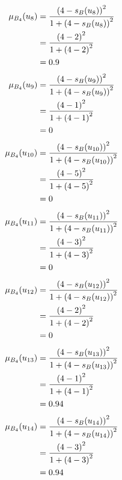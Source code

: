 \documentclass[a4paper]{book}
\begin{document}
				\begin{align}
					\mu_{B_4}(u_8) &= \frac{\left(4-s_B(u_8)\right)^2}{1 + \left(4-s_B(u_8)\right)^2}\\
					&= \frac{\left(4-2\right)^2}{1 + \left(4-2\right)^2} \notag \\
					&= 0.9 \notag
				\end{align}
				\begin{align}
					\mu_{B_4}(u_9) &= \frac{\left(4-s_B(u_9)\right)^2}{1 + \left(4-s_B(u_9)\right)^2}\\
					&= \frac{\left(4-1\right)^2}{1 + \left(4-1\right)^2} \notag \\
					&= 0 \notag
				\end{align}
				\begin{align}
					\mu_{B_4}(u_{10}) &= \frac{\left(4-s_B(u_{10})\right)^2}{1 + \left(4-s_B(u_{10})\right)^2}\\
					&= \frac{\left(4-5\right)^2}{1 + \left(4-5\right)^2} \notag \\
					&= 0 \notag
				\end{align}
				\begin{align}
					\mu_{B_4}(u_{11}) &= \frac{\left(4-s_B(u_{11})\right)^2}{1 + \left(4-s_B(u_{11})\right)^2}\\
					&= \frac{\left(4-3\right)^2}{1 + \left(4-3\right)^2} \notag \\
					&= 0 \notag
				\end{align}
				\begin{align}
					\mu_{B_4}(u_{12}) &= \frac{\left(4-s_B(u_{12})\right)^2}{1 + \left(4-s_B(u_{12})\right)^2}\\
					&= \frac{\left(4-2\right)^2}{1 + \left(4-2\right)^2} \notag \\
					&= 0 \notag
				\end{align}
				\begin{align}
					\mu_{B_4}(u_{13}) &= \frac{\left(4-s_B(u_{13})\right)^2}{1 + \left(4-s_B(u_{13})\right)^2}\\
					&= \frac{\left(4-1\right)^2}{1 + \left(4-1\right)^2} \notag \\
					&= 0.94 \notag
				\end{align}
				\begin{align}
					\mu_{B_4}(u_{14}) &= \frac{\left(4-s_B(u_{14})\right)^2}{1 + \left(4-s_B(u_{14})\right)^2}\\
					&= \frac{\left(4-3\right)^2}{1 + \left(4-3\right)^2} \notag \\
					&= 0.94 \notag
				\end{align}
\end{document}

